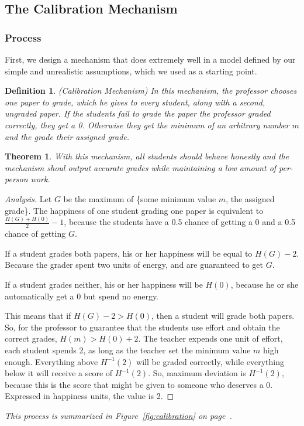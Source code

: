 \documentclass[12pt, Arial]{article}
\newtheorem{theorem}{Theorem}
\newtheorem{definition}{Definition}
\begin{document}
\subsection{The Calibration Mechanism}
\label{sec:calibration}

\subsubsection{Process}
First, we design a mechanism that does extremely well in a model defined by our simple and unrealistic assumptions, which we used as a starting point.
\begin{definition}(Calibration Mechanism)
In this mechanism, the professor chooses one paper to grade, which he gives to every student, along with a second, ungraded paper. If the students fail to grade the paper the professor graded correctly, they get a 0. Otherwise they get the minimum of an arbitrary number $m$ and the grade their assigned grade.
\end{definition}
\begin{theorem}
With this mechanism, all students should behave honestly and the mechanism shoul output accurate grades while maintaining a low amount of per-person work.
\end{theorem}

\begin{proof}[Analysis]
Let $G$ be the maximum of \{some minimum value $m$, the assigned grade\}.
The happiness of one student grading one paper is equivalent to $\frac{H(G)+H(0)}{2}-1$, because the students have a 0.5 chance of getting a 0 and a 0.5 chance of getting $G$.

If a student grades both papers, his or her happiness will be equal to $H(G)-2$. Because the grader spent two units of energy, and are guaranteed to get $G$.

If a student grades neither, his or her happiness will be $H(0)$, because he or she automatically get a 0 but spend no energy.

This means that if $H(G) - 2 > H(0)$, then a student will grade both papers. So, for the professor to guarantee that the students use effort and obtain the correct grades, $H(m) > H(0) + 2$.
The teacher expends one unit of effort, each student spends 2, as long as the teacher set the minimum value $m$ high enough.
Everything above $H^{-1}(2)$ will be graded correctly, while everything below it will receive a score of $H^{-1}(2)$.
So, maximum deviation is $H^{-1}(2)$, because this is the score that might be given to someone who deserves a 0. Expressed in happiness units, the value is 2.
\end{proof}
\emph{This process is summarized in Figure~\ref{fig:calibration} on page~\pageref{fig:calibration}.}
\end{document}
